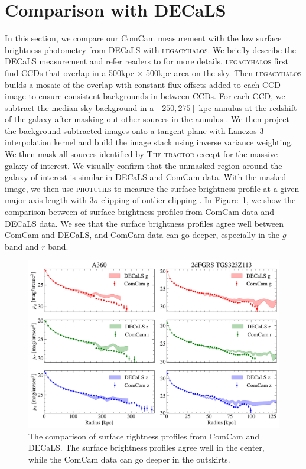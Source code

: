 \documentclass[SE,lsstdraft,authoryear,toc]{lsstdoc}
\newcommand{\lhalos}{\textsc{legacyhalos} }
\begin{document}
\section{Comparison with DECaLS}

In this section, we compare our ComCam measurement with the low surface brightness photometry from DECaLS with \textsc{legacyhalos}. We briefly describe the DECaLS measurement and refer readers to \citep{liReachingEdgeProbing2022,moustakasSienaGalaxyAtlas2023} for more details.  \lhalos first find CCDs that overlap in a 500kpc $\times$ 500kpc area on the sky. Then \lhalos builds a mosaic of the overlap with constant flux offsets added to each CCD image to ensure consistent backgrounds in between CCDs. For each CCD, we subtract the median sky background in a $[250, 275]$ kpc annulus at the redshift of the galaxy after masking out other sources in the annulus \citep{liReachingEdgeProbing2022}. We then project the background-subtracted images onto a tangent plane with Lanczos-3 interpolation kernel and build the image stack using inverse variance weighting. We then mask all sources identified by \textsc{The tractor} \citep{langTractorProbabilisticAstronomical2016} except for the massive galaxy of interest. We visually confirm that the unmasked region around the galaxy of interest is similar in DECaLS and ComCam data. With the masked image, we then use \textsc{photutils} to measure the surface brightness profile at a given major axis length with $3\sigma$ clipping of outlier clipping \citep{huangIndividualStellarHaloes2018, liReachingEdgeProbing2022}. In Figure~\ref{fig:comparison}, we show the comparison between of surface brightness profiles from ComCam data and DECaLS data. We see that the surface brightness profiles agree well between ComCam and DECaLS, and ComCam data can go deeper, especially in the $g$ band and $r$ band.


\begin{figure}[!htbp]
  \centering
  \includegraphics[width=1.0\linewidth]{figures/comparison.pdf}
  \caption{The comparison of surface rightness profiles from ComCam and DECaLS. The surface brightness profiles agree well in the center, while the ComCam data can go deeper in the outskirts.}
  \label{fig:comparison}
\end{figure}
\end{document}
